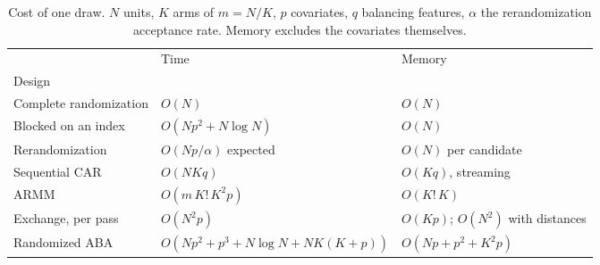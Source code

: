 \begin{table}[t]
\centering
\caption{Cost of one draw. $N$ units, $K$ arms of $m = N/K$, $p$ covariates, $q$ balancing features, $\alpha$ the rerandomization acceptance rate. Memory excludes the covariates themselves.}
\label{tab:cost}
\begin{tabular}{lll}
\toprule
 & Time & Memory \\
Design &  &  \\
\midrule
Complete randomization & $O(N)$ & $O(N)$ \\
Blocked on an index & $O(Np^2 + N \log N)$ & $O(N)$ \\
Rerandomization & $O(Np/\alpha)$ expected & $O(N)$ per candidate \\
Sequential CAR & $O(NKq)$ & $O(Kq)$, streaming \\
ARMM & $O(m\,K!\,K^2 p)$ & $O(K!\,K)$ \\
Exchange, per pass & $O(N^2 p)$ & $O(Kp)$; $O(N^2)$ with distances \\
Randomized ABA & $O(Np^2 + p^3 + N\log N + NK(K+p))$ & $O(Np + p^2 + K^2p)$ \\
\bottomrule
\end{tabular}
\end{table}
